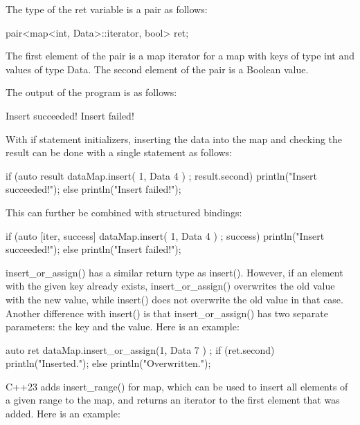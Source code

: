 The type of the ret variable is a pair as follows:

\begin{cpp}
pair<map<int, Data>::iterator, bool> ret;
\end{cpp}

The first element of the pair is a map iterator for a map with keys of type int and values of type Data. The second element of the pair is a Boolean value.

The output of the program is as follows:

\begin{shell}
Insert succeeded!
Insert failed!
\end{shell}

With if statement initializers, inserting the data into the map and checking the result can be done with a single statement as follows:

\begin{cpp}
if (auto result { dataMap.insert({ 1, Data { 4 } }) }; result.second) {
    println("Insert succeeded!");
} else {
    println("Insert failed!");
}
\end{cpp}

This can further be combined with structured bindings:

\begin{cpp}
if (auto [iter, success] { dataMap.insert({ 1, Data { 4 } }) }; success) {
    println("Insert succeeded!");
} else {
    println("Insert failed!");
}
\end{cpp}


insert\_or\_assign() has a similar return type as insert(). However, if an element with the given key already exists, insert\_or\_assign() overwrites the old value with the new value, while insert() does not overwrite the old value in that case. Another difference with insert() is that insert\_or\_assign() has two separate parameters: the key and the value. Here is an example:

\begin{cpp}
auto ret { dataMap.insert_or_assign(1, Data { 7 }) };
if (ret.second) { println("Inserted."); }
else { println("Overwritten."); }
\end{cpp}



C++23 adds insert\_range() for map, which can be used to insert all elements of a given range to the map, and returns an iterator to the first element that was added. Here is an example:

